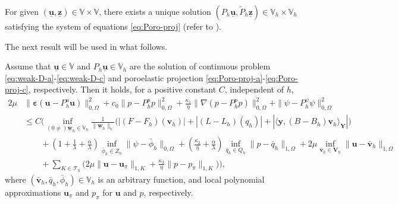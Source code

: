 \documentclass[smallextended]{svjour3}
\numberwithin{equation}{section}
\numberwithin{figure}{section}
\numberwithin{table}{section}
\newcommand\bV{\mathbf{V}}
\newcommand\ff{\boldsymbol{f}}
\newcommand\beps{\boldsymbol{\varepsilon}}
\newcommand{\tP}{\tilde{P}}
\newcommand\buu{\underline{\boldsymbol{u}}}
\newcommand\buv{\underline{\boldsymbol{v}}}
\newcommand\buw{\underline{\boldsymbol{w}}}
\newcommand\buz{\underline{\boldsymbol{z}}}
\newcommand\by{\boldsymbol{y}}
\newcommand\bu{\boldsymbol{u}}
\newcommand\bv{\boldsymbol{v}}
\newcommand{\bY}{\boldsymbol{Y}}
\newcommand\cT{\mathcal{T}}
\newcommand{\bbV}{\mathbb{V}}
\newcommand{\bbR}{\mathbb{R}}
\begin{document}
For given $(\buu, \buz) \in \bbV \times \bbV$, there exists a unique solution $(P_h \buu, \tP_h \buz) \in \bbV_h \times \bbV_h$ satisfying the system of equations \eqref{eq:Poro-proj} (refer to \cite{verma24}).


The next result will be used in what follows.

\begin{lemma} \label{lem:dis-proj}
		Assume that $\buu \in \bbV$ and $P_h \buu \in \bbV_h$ are the solution of continuous problem  \eqref{eq:weak-D-a}-\eqref{eq:weak-D-c} and poroelastic projection \eqref{eq:Poro-proj-a}-\eqref{eq:Poro-proj-c}, respectively.
		 Then it holds, for a positive constant $C$, independent of $h$,
    \begin{align*}
		2 \mu & \| \beps(\bu - P_h^u \bu) \|_{0, \Omega}^2  + c_0 \| p - P_h^p p \|_{0, \Omega}^2 +  \frac{\kappa_1}{\eta} \| \nabla (p - P_h^p p)\|_{0, \Omega}^2+ \| \psi - P_h^{\psi} \psi \|_{0, \Omega}^2 \\
		& \le C \bigg( \inf_{(0 \neq)\buw_h \in \bbV_h}\frac{1}{\|\buw_h\|_{\bbV}} \Big( |(F-F_h)(\bv_h)|  + |(L-L_h)(q_h)| + |\langle \by, (B-B_h) \bv_h \rangle_{\bY}| \Big)  \\
        & \qquad + \left( 1 + \frac{1}{\lambda} + \frac{\alpha}{\lambda} \right) \inf_{\bar{\phi}_h \in Z_h} \|\psi-\bar{\phi}_h\|_{0, \Omega}+  \left(  \frac{\kappa_2}{\eta} + \frac{\alpha}{\lambda} \right) \inf_{\bar{q}_h \in Q_h}  \| p- \bar{q}_h \|_{1, \Omega} + 2 \mu \inf_{\bar{\bv}_h \in \bV_h} \| \bu - \bar{\bv}_h\|_{1, \Omega}  \\
        & \qquad + \sum_{K \in \cT_h} \Big( 2 \mu \|\bu - \bu_{\pi} \|_{1, K}  + \frac{\kappa_2}{\eta} \|p- p_{\pi}\|_{1, K} \Big) \bigg),
    \end{align*}
    where $(\bar{\bv}_h, \bar{q}_h, \bar{\phi}_h) \in \bbV_h$ is an arbitrary function, and local polynomial approximations $\bu_{\pi}$ and $p_{\pi}$ for $\bu$ and $p$, respectively.
\end{lemma}
\end{document}
